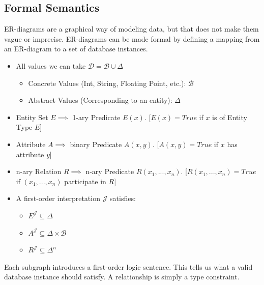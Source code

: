 \subsection{Formal Semantics}
ER-diagrams are a graphical way of modeling data, but that does not make them vague or imprecise. ER-diagrams can be made formal by defining a mapping from an ER-diagram to a set of database instances.
\begin{itemize}
\item All values we can take $\mathcal{D} = \mathcal{B} \cup \Delta$
\begin{itemize}
\item Concrete Values (Int, String, Floating Point, etc.): $\mathcal{B}$
\item Abstract Values (Corresponding to an entity): $\Delta$
\end{itemize}
\item Entity Set $E \implies$ 1-ary Predicate $E(x)$. [$E(x) = True$ if $x$ is of Entity Type $E$]
\item Attribute $A \implies$ binary Predicate $A(x,y)$. [$A(x,y) = True$ if $x$ has attribute $y$]
\item n-ary Relation $R \implies$ n-ary Predicate $R(x_1, ..., x_n)$. [$R(x_1, ..., x_n) = True$ if $(x_1, ..., x_n)$ participate in $R$]
\item A first-order interpretation $\mathcal{J}$ satisfies:
\begin{itemize}
\item $E^\mathcal{J} \subseteq \Delta$
\item $A^\mathcal{J} \subseteq \Delta \times \mathcal{B}$
\item $R^\mathcal{J} \subseteq \Delta^n$
\end{itemize}
\end{itemize}
Each subgraph introduces a first-order logic sentence. This tells us what a valid database instance should satisfy. A relationship is simply a type constraint.
